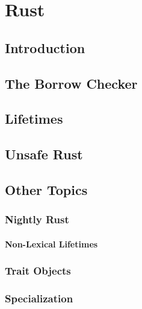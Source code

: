 \chapter{Rust\label{ch:rust}}


\section{Introduction}
\blindtext{}



\section{The Borrow Checker}
\blindtext{}



\section{Lifetimes\label{sec:rust-lifetimes}}
\blindtext{}



\section{Unsafe Rust}
\blindtext{}



\section{Other Topics}
\blindtext{}


\subsection{Nightly Rust}
\blindtext{}


\subsubsection{Non-Lexical Lifetimes\label{sec:nll}}
\blindtext{}


\subsection{Trait Objects\label{sec:trait-objects}}
\blindtext{}


\subsection{Specialization\label{sec:specialization}}
\blindtext{}
